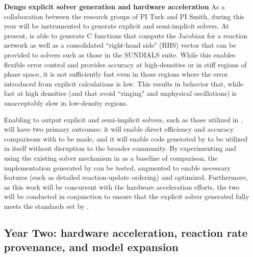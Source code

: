 \noindent \textbf{Dengo explicit solver generation and hardware acceleration}
As a collaboration between the research groups of PI Turk and PI Smith, during
this year \dengo{} will be instrumented to generate explicit and semi-implicit
solvers.  At present, \dengo{} is able to generate C functions that compute the
Jacobian for a reaction network as well as a consolidated ``right-hand side"
(RHS)
vector that can be provided to solvers such as those in the SUNDIALS suite.
While this enables flexible error control and provides accuracy at
high-densities or in stiff regions of phase space, it is not sufficiently fast
even in those regions where the error introduced from explicit calculations is
low.  This results in behavior that, while fast at high densities (and that
avoid ``ringing" and unphysical oscillations) is unacceptably slow in
low-density regions.

Enabling \dengo{} to output explicit and semi-implicit solvers, such as those
utilized in \grackle{}, will have two primary outcomes: it will enable direct
efficiency and accuracy comparisons with \grackle{} to be made, and it will
enable code generated by \dengo{} to be utilized in \grackle{} itself without
disruption to the broader community.  By experimenting and using the
existing solver mechanism in \grackle{} as a baseline of comparison, the
implementation generated by \dengo{} can be tested, augmented to enable
necessary features (such as detailed reaction-update ordering) and optimized.
Furthermore, as this work will be concurrent with the \grackle{} hardware
acceleration efforts, the two will be conducted in conjunction to ensure that
the explicit solver generated fully meets the standards set by \grackle{}.

\subsection{Year Two: hardware acceleration, reaction rate provenance,
  and model expansion}

